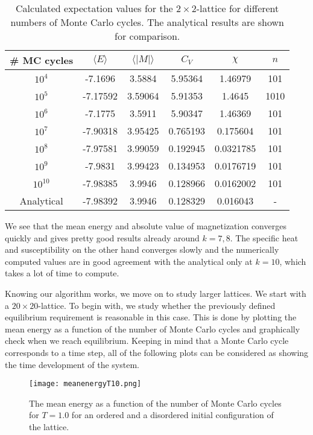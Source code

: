 \documentclass[english, 12pt]{article}
\begin{document}
\begin{table}[hbt!]
\centering
\begin{tabular}{|c|c|c|c|c|c|}
 \# MC cycles & $\langle E\rangle $ & $\langle |M|\rangle$ & $C_V$ & $\chi$ & $n$ \\ \hline
$10^4$  &  -7.1696      &  3.5884  &  5.95364       &   1.46979 & 101\\
$10^5$  &  -7.17592     &   3.59064 &   5.91353     &    1.4645 & 1010\\
$10^6$  &  -7.1775     &   3.5911   & 5.90347       &   1.46369 & 101\\
$10^7$  &  -7.90318   &     3.95425 &   0.765193    &      0.175604 & 101\\
$10^8$  &  -7.97581  &     3.99059  &  0.192945     &     0.0321785 & 101\\
$10^9$  &  -7.9831  &      3.99423  &  0.134953       &   0.0176719 & 101\\
$10^{10}$  &  -7.98385 &       3.9946 &   0.128966   &      0.0162002 & 101\\ \hline
Analytical &  -7.98392 & 3.9946 & 0.128329 & 0.016043 & - \\ \hline
\end{tabular}
\caption{Calculated expectation values for the $2\times2$-lattice for different numbers of Monte Carlo cycles. The analytical results are shown for comparison.}
\end{table}

We see that the mean energy and absolute value of magnetization converges quickly and gives pretty good results already around $k=7,8$. The specific heat and susceptibility on the other hand converges slowly and the numerically computed values are in good agreement with the analytical only at $k=10$, which takes a lot of time to compute.

Knowing our algorithm works, we move on to study larger lattices. We start with a $20\times20$-lattice. To begin with, we study whether the previously defined equilibrium requirement is reasonable in this case. This is done by plotting the mean energy as a function of the number of Monte Carlo cycles and graphically check when we reach equilibrium. Keeping in mind that a Monte Carlo cycle corresponds to a time step, all of the following plots can be considered as showing the time development of the system.


\begin{figure}[hbt!]
\centering
\texttt{[image: meanenergyT10.png]}
\caption{The mean energy as a function of the number of Monte Carlo cycles for $T=1.0$ for an ordered and a disordered initial configuration of the lattice.}
\end{figure}
\end{document}

